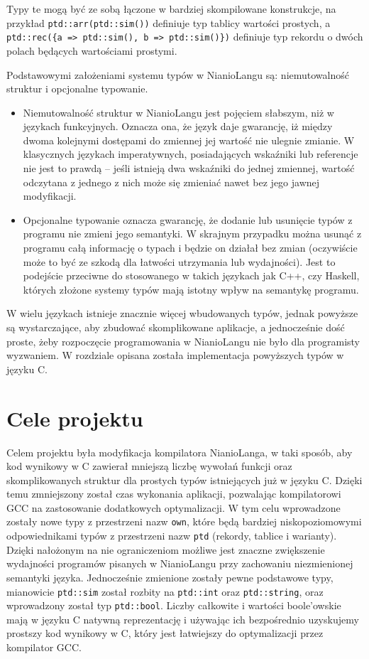 \documentclass[licencjacka]{pracamgr}
\begin{document}
Typy te mogą być ze sobą łączone w bardziej skompilowane konstrukcje, na przykład \texttt{ptd::arr(ptd::sim())} definiuje
typ tablicy wartości prostych, a \texttt{ptd::rec(\{a => ptd::sim(), b => ptd::sim()\})} definiuje typ rekordu o dwóch polach będących wartościami
prostymi.

Podstawowymi założeniami systemu typów w NianioLangu są: niemutowalność struktur i opcjonalne typowanie.

\begin{itemize}
 \item Niemutowalność struktur w NianioLangu jest pojęciem słabszym, niż w językach funkcyjnych. Oznacza ona,
 że język daje gwarancję, iż między dwoma kolejnymi dostępami do zmiennej jej wartość nie ulegnie zmianie.
 W klasycznych językach imperatywnych, posiadających wskaźniki lub referencje nie jest to prawdą -- jeśli istnieją dwa wskaźniki
 do jednej zmiennej, wartość odczytana z jednego z nich może się zmieniać nawet bez jego jawnej modyfikacji.
 \item Opcjonalne typowanie oznacza gwarancję, że dodanie lub usunięcie typów z programu nie zmieni jego semantyki.
 W skrajnym przypadku można usunąć z programu całą informację o typach i będzie on działał bez zmian
 (oczywiście może to być ze szkodą dla łatwości utrzymania lub wydajności). Jest to podejście przeciwne do stosowanego
 w takich językach jak C++, czy Haskell, których złożone systemy typów mają istotny wpływ na semantykę programu.
\end{itemize}

W wielu językach istnieje znacznie więcej wbudowanych typów, jednak powyższe są wystarczające, aby zbudować skomplikowane aplikacje,
a jednocześnie dość proste, żeby rozpoczęcie programowania w NianioLangu nie było dla programisty wyzwaniem.
W rozdziale \textit{} opisana została implementacja powyższych typów w języku C.

\section{Cele projektu}
Celem projektu była modyfikacja kompilatora NianioLanga, w taki sposób, aby kod wynikowy w C zawierał mniejszą liczbę wywołań funkcji oraz
skomplikowanych
struktur dla prostych typów istniejących już w języku C.
Dzięki temu zmniejszony został czas wykonania aplikacji, pozwalając kompilatorowi GCC na zastosowanie dodatkowych optymalizacji.
W tym celu wprowadzone zostały nowe typy z przestrzeni nazw \texttt{own},
które będą bardziej niskopoziomowymi odpowiednikami typów z przestrzeni nazw \texttt{ptd} (rekordy, tablice i warianty).
Dzięki nałożonym na nie ograniczeniom możliwe jest znaczne zwiększenie wydajności programów pisanych w NianioLangu przy zachowaniu
niezmienionej semantyki języka.
Jednocześnie zmienione zostały pewne podstawowe typy, mianowicie \texttt{ptd::sim} został rozbity na
\texttt{ptd::int} oraz \texttt{ptd::string}, oraz wprowadzony został typ \texttt{ptd::bool}.
Liczby całkowite i wartości boole'owskie mają w języku C natywną reprezentację i używając ich bezpośrednio
uzyskujemy prostszy kod wynikowy w C, który jest łatwiejszy do optymalizacji przez kompilator GCC.
\end{document}
